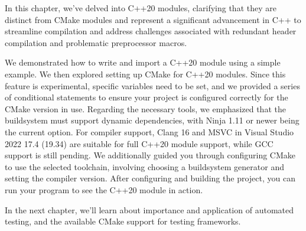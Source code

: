 In this chapter, we’ve delved into C++20 modules, clarifying that they are distinct from CMake modules and represent a significant advancement in C++ to streamline compilation and address challenges associated with redundant header compilation and problematic preprocessor macros.

We demonstrated how to write and import a C++20 module using a simple example. We then explored setting up CMake for C++20 modules. Since this feature is experimental, specific variables need to be set, and we provided a series of conditional statements to ensure your project is configured correctly for the CMake version in use.
Regarding the necessary tools, we emphasized that the buildsystem must support dynamic dependencies, with Ninja 1.11 or newer being the current option. For compiler support, Clang 16 and MSVC in Visual Studio 2022 17.4 (19.34) are suitable for full C++20 module support, while GCC support is still pending. We additionally guided you through configuring CMake to use the selected toolchain, involving choosing a buildsystem generator and setting the compiler version. After configuring and building the project, you can run your program to see the C++20 module in action.

In the next chapter, we’ll learn about importance and application of automated testing, and the available CMake support for testing frameworks.